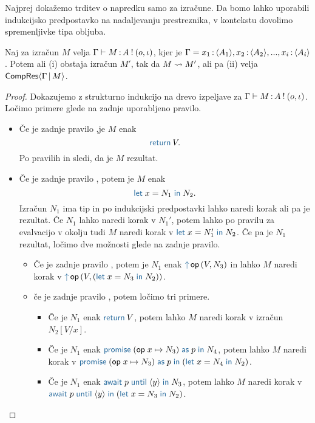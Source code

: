 Najprej dokažemo trditev o napredku samo za izračune. Da bomo lahko uporabili indukcijsko predpostavko na nadaljevanju prestreznika, v kontekstu dovolimo spremenljivke tipa obljuba.

\begin{trditev}[o napredku]\label{trd:gamma-napredek}
	Naj za izračun $M$ velja $\Gamma \vdash M \mathinner{:} A \mathbin{!} (o, \iota)$, kjer je $\Gamma = x_1 \mathinner{:} \langle A_1 \rangle, x_2 \mathinner{:} \langle A_2 \rangle,..., x_i \mathinner{:} \langle A_i \rangle$. Potem ali (i) obstaja izračun $M'$, tak da $M \leadsto M'$, ali pa (ii) velja $\mathsf{CompRes}\langle\Gamma \,\vert\, M\rangle$.
\end{trditev}

\begin{proof}
	Dokazujemo z strukturno indukcijo na drevo izpeljave za $\Gamma \vdash M \mathinner{:} A \mathbin{!} (o, \iota)$.
	Ločimo primere glede na zadnje uporabljeno pravilo.
	
	\begin{itemize}
		\item Če je zadnje pravilo ,je $M$ enak $$\tmreturn{V}.$$
		Po pravilih  in  sledi, da je $M$ rezultat.
		
		\item Če je zadnje pravilo , potem je $M$ enak $$\tmlet{x}{N_1}{N_2}.$$
		Izračun $N_1$ ima tip in po indukcijski predpostavki lahko naredi korak ali pa je rezultat. Če $N_1$ lahko naredi korak v $N_1'$, potem lahko po pravilu za evalvacijo v okolju tudi $M$ naredi korak v $\tmlet{x}{N_1'}{N_2}$.
		Če pa je $N_1$ rezultat, ločimo dve možnosti glede na zadnje pravilo. 
		\begin{itemize}
			\item Če je zadnje pravilo , potem je $N_1$ enak $\tmopout{op}{V}{N_3}$ in lahko $M$ naredi korak v $\tmopout{op}{V}{(\tmlet{x}{N_3}{N_2})}$.
			\item če je zadnje pravilo , potem ločimo tri primere.
			\begin{itemize}
				\item Če je $N_1$ enak $\tmreturn{V}$, potem lahko $M$ naredi korak v izračun $N_2[V/x]$.
				\item Če je $N_1$ enak $\tmwith{op}{x}{N_3}{p}{N_4}$, potem lahko $M$ naredi korak v $\tmwith{op}{x}{N_3}{p}{(\tmlet{x}{N_4}{N_2})}$.
				\item Če je $N_1$ enak $\tmawait{p}{y}{N_3}$, potem lahko $M$ naredi korak v $\tmawait{p}{y}{(\tmlet{x}{N_3}{N_2})}$.
			\end{itemize}
			

\end{itemize}
\end{itemize}
\end{proof}
